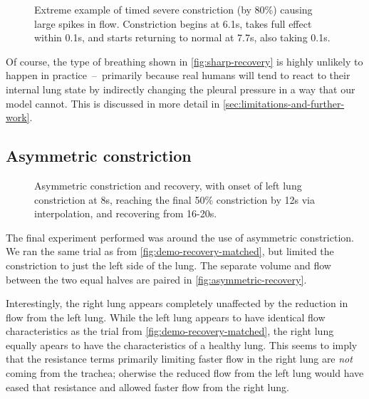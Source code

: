 
\begin{figure}[hb]
    \centering
    \begin{tikzpicture}
        
    \end{tikzpicture}
    \caption{
        Extreme example of timed severe constriction (by 80\%) causing large spikes in flow.
        Constriction begins at 6.1s, takes full effect within 0.1s, and starts returning to normal
        at 7.7s, also taking 0.1s.
    }
    \label{fig:sharp-recovery}
\end{figure}

Of course, the type of breathing shown in \autoref{fig:sharp-recovery} is highly unlikely to happen
in practice~--~primarily because real humans will tend to react to their internal lung state by
indirectly changing the pleural pressure in a way that our model cannot. This is discussed in more
detail in \autoref{sec:limitations-and-further-work}.

\subsection{Asymmetric constriction}

\begin{figure}[h]
    \centering
    \begin{tikzpicture}
        
    \end{tikzpicture}
    \caption{
        Asymmetric constriction and recovery, with onset of left lung constriction at 8s, reaching
        the final 50\% constriction by 12s via  interpolation, and recovering from
        16-20s.
    }
    \label{fig:asymmetric-recovery}
\end{figure}

The final experiment performed was around the use of asymmetric constriction. We ran the same trial
as from \autoref{fig:demo-recovery-matched}, but limited the constriction to just the left side of
the lung. The separate volume and flow between the two equal halves are paired in
\autoref{fig:asymmetric-recovery}.

Interestingly, the right lung appears completely unaffected by the reduction in flow from the left
lung. While the left lung appears to have identical flow characteristics as the trial from
\autoref{fig:demo-recovery-matched}, the right lung equally apears to have the characteristics of a
healthy lung. This seems to imply that the resistance terms primarily limiting faster flow in the
right lung are \textit{not} coming from the trachea; oherwise the reduced flow from the left lung
would have eased that resistance and allowed faster flow from the right lung.


